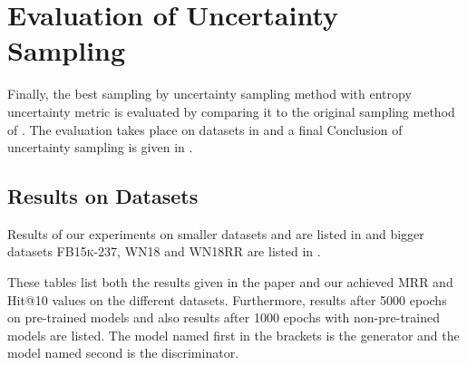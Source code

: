 \section{Evaluation of Uncertainty Sampling}
\label{ch:evaluation:sec:evaluation_uncertainty}
%
Finally, the best sampling by uncertainty sampling method \ussoftmax with entropy uncertainty metric is evaluated by comparing it to the original sampling method \origsampling of \kbgan.
The evaluation takes place on datasets in  and a final Conclusion of uncertainty sampling is given in .
%
\subsection{Results on Datasets} \label{subsec:results_uncertainty}









Results of our experiments on smaller datasets \umls and \kinship  are listed in  and bigger datasets \textsc{FB15k-237},  \textsc{WN18} and \textsc{WN18RR} are listed in .


These tables list both the results given in the \kbgan paper \cite{cai2017kbgan} and our achieved MRR and Hit@10 values on the different datasets.
Furthermore, results after 5000 epochs on pre-trained models and also results after 1000 epochs with non-pre-trained models are listed.
The model named first in the brackets is the generator and the model named second is the discriminator.


